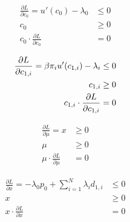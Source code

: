 \bigskip

\begin{minipage}{0.45\textwidth}
    \begin{subequations}\label{eq:lagr1,c_0}
    \begin{align}
        \frac{\partial L}{\partial c_0} = u'(c_0) - \lambda_0 & \leq 0\\
        c_0 & \geq 0 \\
        c_0 \cdot \frac{\partial L}{\partial c_0} & = 0
    \end{align}
    \end{subequations}
\end{minipage}\hfill
\begin{minipage}{0.45\textwidth}
    \begin{subequations}\label{eq:lagr1,c_{1,i}}
    \begin{align}
        \frac{\partial L}{\partial c_{1,i}} = \beta \pi_i u'(c_{1,i}) - \lambda_i & \leq 0\\
        c_{1,i} & \geq 0 \\
        c_{1,i} \cdot \frac{\partial L}{\partial c_{1,i}} & = 0
    \end{align}
    \end{subequations}    
\end{minipage}\hfill

\bigskip

\begin{minipage}{0.45\textwidth}
    \begin{subequations}\label{eq:lagr1,mu}
    \begin{align}
        \frac{\partial L}{\partial \mu} = x & \geq 0\\
        \mu & \geq 0 \\
        \mu \cdot \frac{\partial L}{\partial \mu} & = 0
    \end{align}
    \end{subequations}    
\end{minipage}\hfill
\begin{minipage}{0.45\textwidth}
    \begin{subequations}\label{eq:lagr1,x}
    \begin{align}
        \frac{\partial L}{\partial x} = -\lambda_0 p_0 + \sum_{i=1}^{N} \lambda_i d_{1,i} & \leq 0\\
        x & \geq 0 \\
        x \cdot \frac{\partial L}{\partial x} & = 0
    \end{align}
    \end{subequations}    
\end{minipage}\hfill

